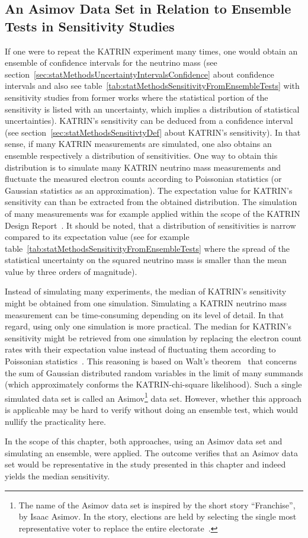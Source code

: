 \subsection{An Asimov Data Set in Relation to Ensemble Tests in Sensitivity Studies}
\label{sec:katrinElossStatisticsAsimov}
If one were to repeat the KATRIN experiment many times, one would obtain an ensemble of confidence intervals for the neutrino mass (see section~\ref{sec:statMethodsUncertaintyIntervalsConfidence} about confidence intervals and also see table~\ref{tab:statMethodsSensitivityFromEnsembleTests} with sensitivity studies from former works where the statistical portion of the sensitivity is listed with an uncertainty, which implies a distribution of statistical uncertainties). KATRIN's sensitivity can be deduced from a confidence interval (see section~\ref{sec:statMethodsSensitivtyDef} about KATRIN's sensitivity). In that sense, if many KATRIN measurements are simulated, one also obtains an ensemble respectively a distribution of sensitivities. One way to obtain this distribution is to simulate many KATRIN neutrino mass measurements and fluctuate the measured electron counts according to Poissonian statistics (or Gaussian statistics as an approximation). The expectation value for KATRIN's sensitivity can than be extracted from the obtained distribution. The simulation of many measurements was for example applied within the scope of the KATRIN Design Report~\cite{Angrik:2005ep}. It should be noted, that a distribution of sensitivities is narrow compared to its expectation value (see for example table~\ref{tab:statMethodsSensitivityFromEnsembleTests} where the spread of the statistical uncertainty on the squared neutrino mass is smaller than the mean value by three orders of magnitude).

Instead of simulating many experiments, the median of KATRIN's sensitivity might be obtained from one simulation. Simulating a KATRIN neutrino mass measurement can be time-consuming depending on its level of detail. In that regard, using only one simulation is more practical. The median for KATRIN's sensitivity might be retrieved from one simulation by replacing the electron count rates with their expectation value instead of fluctuating them according to Poissonian statistics~\cite{Cowan2011}. This reasoning is based on Walt's theorem~\cite{Wald1944} that concerns the sum of Gaussian distributed random variables in the limit of many summands (which approximately conforms the KATRIN-chi-square likelihood). Such a single simulated data set is called an Asimov\footnote{The name of the Asimov data set is inspired by the short story ``Franchise'', by Isaac Asimov. In the story, elections are held by selecting the single most representative voter to replace the entire electorate~\cite{Cowan2011}.} data set. However, whether this approach is applicable may be hard to verify without doing an ensemble test, which would nullify the practicality here.

In the scope of this chapter, both approaches, using an Asimov data set and simulating an ensemble, were applied. The outcome verifies that an Asimov data set would be representative in the study presented in this chapter and indeed yields the median sensitivity.